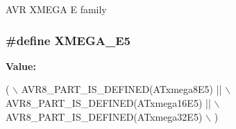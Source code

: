 A\-V\-R X\-M\-E\-G\-A E family \hypertarget{group__xmega__part__macros__group_ga3bbcf2e955c9747a3595f8cdc01436ba}{
\subsubsection[{X\-M\-E\-G\-A\-\_\-\-E5}]{\setlength{\rightskip}{0pt plus 5cm}\#define X\-M\-E\-G\-A\-\_\-\-E5}}\label{group__xmega__part__macros__group_ga3bbcf2e955c9747a3595f8cdc01436ba}
{\bfseries Value\-:}
\begin{DoxyCode}
( \(\backslash\)
        AVR8\_PART\_IS\_DEFINED(ATxmega8E5)   || \(\backslash\)
        AVR8\_PART\_IS\_DEFINED(ATxmega16E5)  || \(\backslash\)
        AVR8\_PART\_IS\_DEFINED(ATxmega32E5)     \(\backslash\)
    )
\end{DoxyCode}
